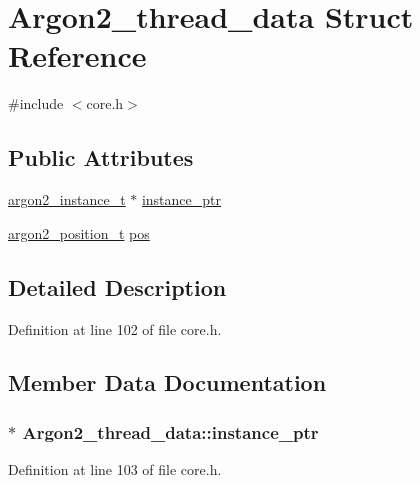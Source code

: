 \hypertarget{struct_argon2__thread__data}{}\section{Argon2\+\_\+thread\+\_\+data Struct Reference}
\label{struct_argon2__thread__data}


{\ttfamily \#include $<$core.\+h$>$}

\subsection*{Public Attributes}
\begin{DoxyCompactItemize}
\item 
\hyperlink{core_8h_ac888abc6f5f9faa538ff23dc92b1e1c2}{argon2\+\_\+instance\+\_\+t} $\ast$ \hyperlink{struct_argon2__thread__data_a54d0463f4eb4d9808383c29bfb5704cf}{instance\+\_\+ptr}
\item 
\hyperlink{core_8h_a24aa65731593323bf283524ded8b6cdb}{argon2\+\_\+position\+\_\+t} \hyperlink{struct_argon2__thread__data_a4f4c0a70218ac7ac50497b0abb33d439}{pos}
\end{DoxyCompactItemize}


\subsection{Detailed Description}


Definition at line 102 of file core.\+h.



\subsection{Member Data Documentation}
\hypertarget{struct_argon2__thread__data_a54d0463f4eb4d9808383c29bfb5704cf}{}
\subsubsection[{instance\+\_\+ptr}]{$\ast$ Argon2\+\_\+thread\+\_\+data\+::instance\+\_\+ptr}\label{struct_argon2__thread__data_a54d0463f4eb4d9808383c29bfb5704cf}


Definition at line 103 of file core.\+h.

